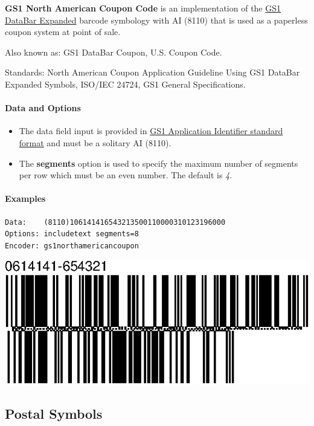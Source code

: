 \textbf{GS1 North American Coupon Code} is an implementation of the
\protect\hyperlink{gs1-databar-expanded}{GS1 DataBar Expanded} barcode
symbology with AI (8110) that is used as a paperless coupon system at
point of sale.

Also known as: GS1 DataBar Coupon, U.S. Coupon Code.

Standards: North American Coupon Application Guideline Using GS1 DataBar
Expanded Symbols, ISO/IEC 24724, GS1 General Specifications.

\hypertarget{data-and-options-41}{%
\paragraph{Data and Options}\label{data-and-options-41}}

\begin{itemize}
\tightlist
\item
  The data field input is provided in
  \protect\hyperlink{gs1-application-identifier-standard-format}{GS1
  Application Identifier standard format} and must be a solitary AI
  (8110).
\item
  The \textbf{segments} option is used to specify the maximum number of
  segments per row which must be an even number. The default is
  \emph{4}.
\end{itemize}

\hypertarget{examples-31}{%
\paragraph{Examples}\label{examples-31}}

\begin{verbatim}
Data:    (8110)106141416543213500110000310123196000
Options: includetext segments=8
Encoder: gs1northamericancoupon
\end{verbatim}

\includegraphics{images/gs1northamericancoupon-1.eps}

\hypertarget{postal-symbols}{%
\subsection{Postal Symbols}\label{postal-symbols}}

